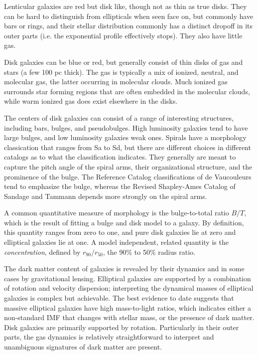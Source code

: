 Lenticular galaxies are red but disk like, though not as thin as true
disks. They can be hard to distinguish from ellipticals when seen face
on, but commonly have bars or rings, and their stellar distribution
commonly has a distinct dropoff in its outer parts (i.e. the
exponential profile effectively stops). They also have little gas. 

Disk galaxies can be blue or red, but generally consist of thin disks
of gas and stars (a few 100 pc thick). The gas is typically a mix of
ionized, neutral, and molecular gas, the latter occurring in molecular
clouds. Much ionized gas surrounds star forming regions that are often
embedded in the molecular clouds, while warm ionized gas does exist
elsewhere in the disks.

The centers of disk galaxies can consist of a range of interesting
structures, including bars, bulges, and pseudobulges. High luminosity
galaxies tend to have large bulges, and low luminosity galaxies weak
ones. Spirals have a morphology classication that ranges from Sa to
Sd, but there are different choices in different catalogs as to what
the classification indicates. They generally are meant to capture the
pitch angle of the spiral arms, their organizational structure, and
the prominence of the bulge.  The Reference Catalog classifications of
de Vaucouleurs tend to emphasize the bulge, whereas the Revised
Shapley-Ames Catalog of Sandage and Tammann depends more strongly on
the spiral arms.

A common quantitative measure of morphology is the bulge-to-total
ratio $B/T$, which is the result of fitting a bulge and disk model to
a galaxy. By definition, this quantity ranges from zero to one, and
pure disk galaxies lie at zero and elliptical galaxies lie at one. A
model independent, related quantity is the {\it concentration},
defined by $r_{90}/r_{50}$, the 90\% to 50\% radius ratio.

The dark matter content of galaxies is revealed by their dynamics and
in some cases by gravitational lensing. Elliptical galaxies are
supported by a combination of rotation and velocity dispersion;
interpreting the dynamical masses of elliptical galaxies is complex
but achievable. The best evidence to date suggests that massive
elliptical galaxies have high mass-to-light ratios, which indicates
either a non-standard IMF that changes with stellar mass, or the
presence of dark matter.  Disk galaxies are primarily supported by
rotation. Particularly in their outer parts, the gas dynamics is
relatively straightforward to interpret and unambiguous signatures of
dark matter are present.

